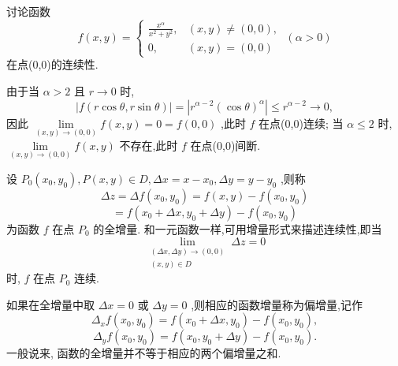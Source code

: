 \begin{example}

\end{example}
讨论函数
\[
f\left( {x,y}\right)  = \left\{  {\begin{matrix} \frac{{x}^{\alpha }}{{x}^{2} + {y}^{2}}, & \left( {x,y}\right)  \neq  \left( {0,0}\right) , \\  0, & \left( {x,y}\right)  = \left( {0,0}\right)  \end{matrix}\;\left( {\alpha  > 0}\right) }\right.
\]
在点(0,0)的连续性.

\begin{solution}

\end{solution}
由于当 \(\alpha  > 2\) 且 \(r \rightarrow  0\) 时,
\[
\left| {f\left( {r\cos \theta ,r\sin \theta }\right) }\right|  = \left| {{r}^{\alpha  - 2}{\left( \cos \theta \right) }^{\alpha }}\right|  \leq  {r}^{\alpha  - 2} \rightarrow  0,
\]
因此 \(\mathop{\lim }\limits_{{\left( {x,y}\right)  \rightarrow  \left( {0,0}\right) }}f\left( {x,y}\right)  = 0 = f\left( {0,0}\right)\) ,此时 \(f\) 在点(0,0)连续; 当 \(\alpha  \leq  2\) 时, \(\mathop{\lim }\limits_{{\left( {x,y}\right)  \rightarrow  \left( {0,0}\right) }}f\left( {x,y}\right)\) 不存在,此时 \(f\) 在点(0,0)间断.

设 \({P}_{0}\left( {{x}_{0},{y}_{0}}\right) ,P\left( {x,y}\right)  \in  D,{\Delta x} = x - {x}_{0},{\Delta y} = y - {y}_{0}\) ,则称
\[
{\Delta z} = {\Delta f}\left( {{x}_{0},{y}_{0}}\right)  = f\left( {x,y}\right)  - f\left( {{x}_{0},{y}_{0}}\right)
\]
\[
= f\left( {{x}_{0} + {\Delta x},{y}_{0} + {\Delta y}}\right)  - f\left( {{x}_{0},{y}_{0}}\right)
\]
为函数 \(f\) 在点 \({P}_{0}\) 的全增量. 和一元函数一样,可用增量形式来描述连续性,即当
\[
\mathop{\lim }\limits_{\substack{{\left( {{\Delta x},{\Delta y}}\right)  \rightarrow  \left( {0,0}\right) } \\  {\left( {x,y}\right)  \in  D} }}{\Delta z} = 0
\]
时, \(f\) 在点 \({P}_{0}\) 连续.

如果在全增量中取 \({\Delta x} = 0\) 或 \({\Delta y} = 0\) ,则相应的函数增量称为偏增量,记作
\[
{\Delta }_{x}f\left( {{x}_{0},{y}_{0}}\right)  = f\left( {{x}_{0} + {\Delta x},{y}_{0}}\right)  - f\left( {{x}_{0},{y}_{0}}\right) ,
\]
\[
{\Delta }_{y}f\left( {{x}_{0},{y}_{0}}\right)  = f\left( {{x}_{0},{y}_{0} + {\Delta y}}\right)  - f\left( {{x}_{0},{y}_{0}}\right) .
\]
一般说来, 函数的全增量并不等于相应的两个偏增量之和.

